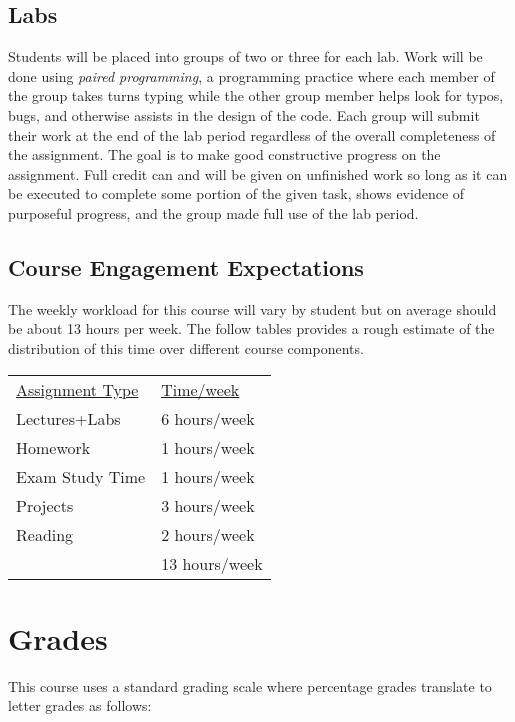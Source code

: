 \documentclass[10pt]{article}
\begin{document}
\subsection*{Labs}

Students will be placed into groups of two or three for each lab. Work will be done using \textit{paired programming}, a programming practice where each member of the group takes turns typing while the other group member helps look for typos, bugs, and otherwise assists in the design of the code. Each group will submit their work at the end of the lab period regardless of the overall completeness of the assignment. The goal is to make good constructive progress on the assignment. Full credit can and will be given on unfinished work so long as it can be executed to complete some portion of the given task, shows evidence of purposeful progress, and the group made full use of the lab period.

\subsection{Course Engagement Expectations}

The weekly workload for this course will vary by student but on average should be about 13 hours per week.  The follow tables provides a rough estimate of the distribution of this time over different course components.
\begin{center}
\begin{tabular}{ll}
\underline{Assignment Type} & \underline{Time/week} \\
Lectures+Labs       & 6 hours/week \\
Homework          & 1 hours/week \\
Exam Study Time    & 1 hours/week \\
Projects          & 3 hours/week \\
Reading &  2 hours/week \\
\bottomrule
 & 13 hours/week
\end{tabular}
\end{center}


\section{Grades}

This course uses a standard grading scale where percentage grades translate to letter grades as follows:
\end{document}
